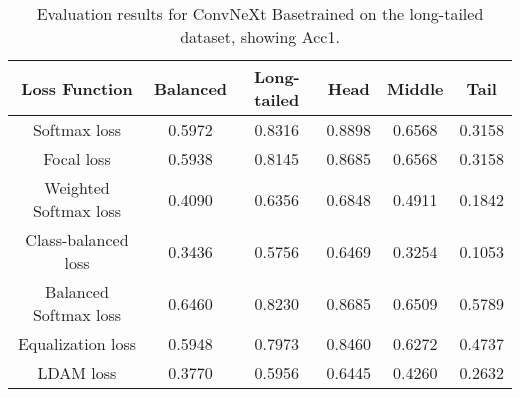 \begin{table}[h!]
    \centering
    \begin{tabular}{cccccc}
        \toprule
        Loss Function & Balanced & Long-tailed & Head & Middle & Tail \\ 
        \midrule
        Softmax loss   & 0.5972 & 0.8316 & 0.8898 & 0.6568 & 0.3158 \\
        Focal loss   & 0.5938 & 0.8145 & 0.8685 & 0.6568 & 0.3158 \\
        Weighted Softmax loss   & 0.4090 & 0.6356 & 0.6848 & 0.4911 & 0.1842 \\
        Class-balanced loss   & 0.3436 & 0.5756 & 0.6469 & 0.3254 & 0.1053 \\
        Balanced Softmax loss   & 0.6460 & 0.8230 & 0.8685 & 0.6509 & 0.5789 \\
        Equalization loss   & 0.5948 & 0.7973 & 0.8460 & 0.6272 & 0.4737 \\
        LDAM loss   & 0.3770 & 0.5956 & 0.6445 & 0.4260 & 0.2632 \\
        \bottomrule
    \end{tabular}
    \caption{Evaluation results for ConvNeXt Basetrained on the long-tailed dataset, showing Acc1.}
    \label{tab:conv_lt_acc1}
\end{table}

